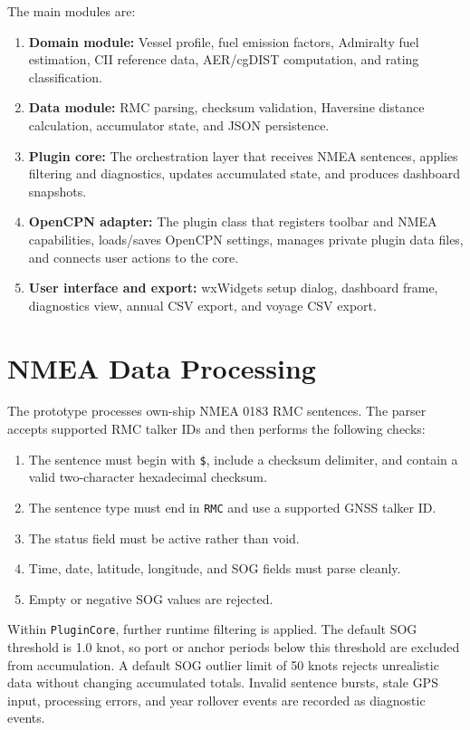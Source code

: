 The main modules are:
\begin{enumerate}
    \item \textbf{Domain module:} Vessel profile, fuel emission factors, Admiralty fuel estimation, CII reference data, AER/cgDIST computation, and rating classification.
    \item \textbf{Data module:} RMC parsing, checksum validation, Haversine distance calculation, accumulator state, and JSON persistence.
    \item \textbf{Plugin core:} The orchestration layer that receives NMEA sentences, applies filtering and diagnostics, updates accumulated state, and produces dashboard snapshots.
    \item \textbf{OpenCPN adapter:} The plugin class that registers toolbar and NMEA capabilities, loads/saves OpenCPN settings, manages private plugin data files, and connects user actions to the core.
    \item \textbf{User interface and export:} wxWidgets setup dialog, dashboard frame, diagnostics view, annual CSV export, and voyage CSV export.
\end{enumerate}

\section{NMEA Data Processing}
The prototype processes own-ship NMEA 0183 RMC sentences. The parser accepts supported RMC talker IDs and then performs the following checks:
\begin{enumerate}
    \item The sentence must begin with \texttt{\$}, include a checksum delimiter, and contain a valid two-character hexadecimal checksum.
    \item The sentence type must end in \texttt{RMC} and use a supported GNSS talker ID.
    \item The status field must be active rather than void.
    \item Time, date, latitude, longitude, and SOG fields must parse cleanly.
    \item Empty or negative SOG values are rejected.
\end{enumerate}

Within \texttt{PluginCore}, further runtime filtering is applied. The default SOG threshold is 1.0 knot, so port or anchor periods below this threshold are excluded from accumulation. A default SOG outlier limit of 50 knots rejects unrealistic data without changing accumulated totals. Invalid sentence bursts, stale GPS input, processing errors, and year rollover events are recorded as diagnostic events.

